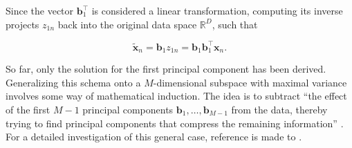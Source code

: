 \documentclass[../../../main.tex]{subfiles}
\begin{document}
Since the vector $\bm{b}_1^\top$ is considered a linear transformation, computing its inverse projects $z_{1n}$ back into the original data space $\mathbb{R}^D$, such that

\begin{equation*}
    \tilde{\bm{x}}_n = \bm{b}_1z_{1n} = \bm{b}_1 \bm{b}_1^\top \bm{x}_n.
\end{equation*}

So far, only the solution for the first principal component has been derived. Generalizing this schema onto a $M$-dimensional subspace with maximal variance involves some way of mathematical induction. The idea is to subtract ``the effect of the first $M-1$ principal components $\bm{b}_1, \dots, \bm{b}_{M-1}$ from the data, thereby trying to find principal components that compress the remaining information'' \cite{dei_2020}. For a detailed investigation of this general case, reference is made to \cite[291]{dei_2020}.
\end{document}
